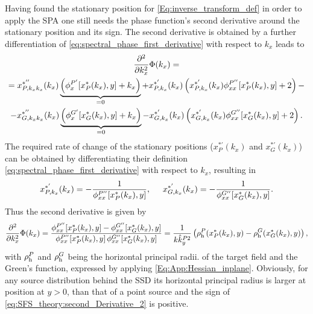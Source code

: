 Having found the stationary position for \eqref{Eq:inverse_transform_def} in order to apply the SPA one still needs the phase function's second derivative around the stationary position and its sign.
The second derivative is obtained by a further differentiation of \eqref{eq:spectral_phase_first_derivative} with respect to $k_x$ leads to
\begin{multline}
\small 
\frac{\partial^2}{\partial k_x^2}\Phi(k_x) = \\ =
  x^{*''}_{P,k_x k_x}(k_x) \underbrace{ \left( \phi^{P'}_x[x^*_P(k_x),y]  + k_x \right)}_{ = 0} + 
  x^{*'}_{P,k_x}(k_x) \left( x^{*'}_{P,k_x}(k_x) \phi^{P''}_{xx}[x^*_P(k_x),y]  +2  \right)  -\\
- x^{*''}_{G,k_x k_x}(k_x) \underbrace{ \left( \phi^{G'}_x[x^*_G(k_x),y]  + k_x \right) }_{ = 0} 
- x^{*'}_{G,k_x}(k_x) \left( x^{*'}_{G,k_x}(k_x)  \phi^{G''}_{xx}[x^*_G(k_x),y]  + 2\right).
\end{multline}
The required rate of change of the stationary positions ($x^{*'}_P(k_x)$ and $x^{*'}_G(k_x)$) can be obtained by differentiating their definition \eqref{eq:spectral_phase_first_derivative} with respect to $k_x$, resulting in
\begin{equation}
x^{*'}_{P,k_x}(k_x) = -\frac{1}{\phi^{P''}_{xx}[x^*_P(k_x),y]}, \hspace{5mm} x^{*'}_{G,k_x}(k_x) = -\frac{1}{\phi^{G''}_{xx}[x^*_G(k_x),y]}.
\end{equation}
Thus the second derivative is given by
\begin{equation}
\label{eq:SFS_theory:second_Derivative_2}
\small
\frac{\partial^2}{\partial k_x^2}\Phi(k_x) = 
\frac{\phi^{P''}_{xx}[x^*_P(k_x),y] - \phi^{G''}_{xx}[x^*_G(k_x),y]}{\phi^{P''}_{xx}[x^*_P(k_x),y] \, \phi^{G''}_{xx}[x^*_G(k_x),y]} = 
\frac{1}{k\hat{k}^{P 2}_y} \left( \rho_\mathrm{h}^P(x^*_P(k_x),y) - \rho_\mathrm{h}^G(x^*_G(k_x),y) \right) 
,
\end{equation}
with $\rho_\mathrm{h}^P$ and $\rho_\mathrm{h}^G$ being the horizontal principal radii. of the target field and the Green's function, expressed by applying \eqref{Eq:App:Hessian_inplane}.
Obviously, for any source distribution behind the SSD its horizontal principal radius is larger at position at $y>0$, than that of a point source and the sign of \eqref{eq:SFS_theory:second_Derivative_2} is positive. 

